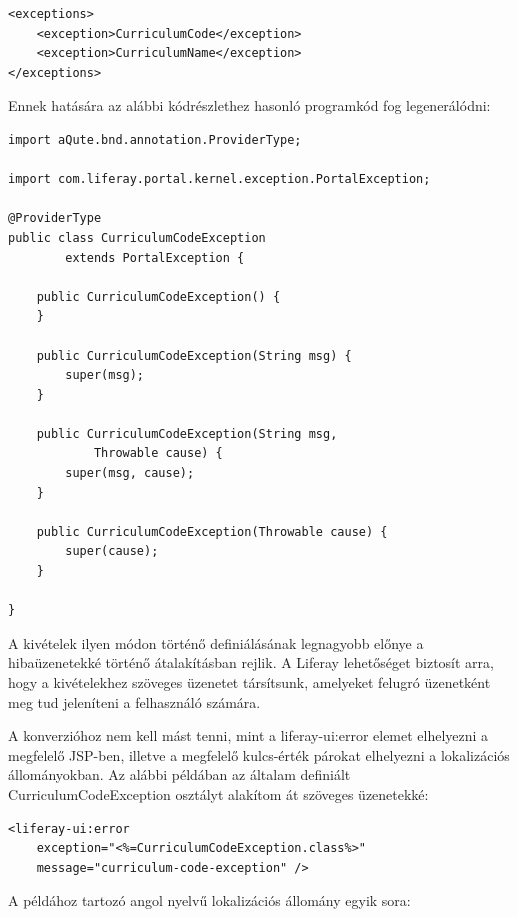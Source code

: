 \documentclass[hidelinks, 12pt, a4paper]{report}
\begin{document}
\begin{minipage}{\linewidth}
\begin{lstlisting}
<exceptions>
	<exception>CurriculumCode</exception>
	<exception>CurriculumName</exception>
</exceptions>
\end{lstlisting}
\end{minipage}

Ennek hatására az alábbi kódrészlethez hasonló programkód fog legenerálódni:

\begin{minipage}{\linewidth}
\begin{lstlisting}
import aQute.bnd.annotation.ProviderType;

import com.liferay.portal.kernel.exception.PortalException;

@ProviderType
public class CurriculumCodeException
		extends PortalException {

	public CurriculumCodeException() {
	}

	public CurriculumCodeException(String msg) {
		super(msg);
	}

	public CurriculumCodeException(String msg,
			Throwable cause) {
		super(msg, cause);
	}

	public CurriculumCodeException(Throwable cause) {
		super(cause);
	}

}
\end{lstlisting}
\end{minipage}

A kivételek ilyen módon történő definiálásának legnagyobb előnye a hibaüzenetekké történő átalakításban rejlik. A Liferay lehetőséget biztosít arra, hogy a kivételekhez szöveges üzenetet társítsunk, amelyeket felugró üzenetként meg tud jeleníteni a felhasználó számára.

A konverzióhoz nem kell mást tenni, mint a liferay-ui:error elemet elhelyezni a megfelelő JSP-ben, illetve a megfelelő kulcs-érték párokat elhelyezni a lokalizációs állományokban. Az alábbi példában az általam definiált CurriculumCodeException osztályt alakítom át szöveges üzenetekké:

\begin{minipage}{\linewidth}
\begin{lstlisting}
<liferay-ui:error
	exception="<%=CurriculumCodeException.class%>"
	message="curriculum-code-exception" />
\end{lstlisting}
\end{minipage}

A példához tartozó angol nyelvű lokalizációs állomány egyik sora:
\end{document}

